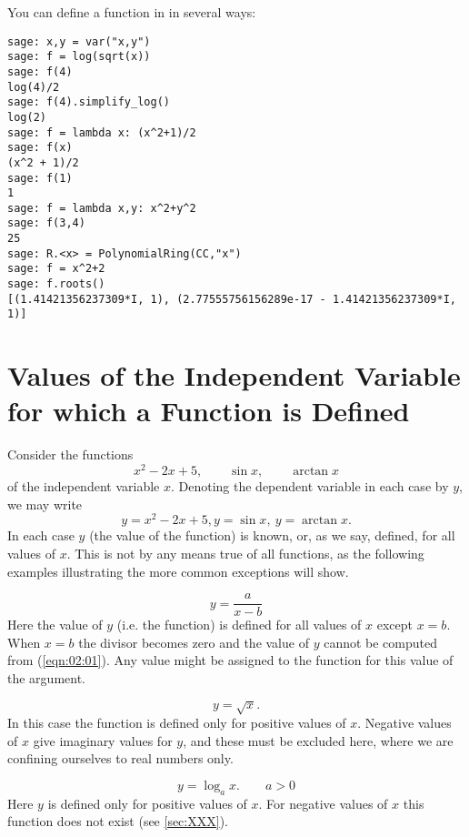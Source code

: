 You can define a function in \SAGE in several ways:

\begin{Verbatim}[fontsize=\scriptsize,fontfamily=courier,fontshape=tt,frame=single,label=\SAGE]
sage: x,y = var("x,y")
sage: f = log(sqrt(x))
sage: f(4)
log(4)/2
sage: f(4).simplify_log()
log(2)
sage: f = lambda x: (x^2+1)/2
sage: f(x)
(x^2 + 1)/2
sage: f(1)
1
sage: f = lambda x,y: x^2+y^2
sage: f(3,4)
25
sage: R.<x> = PolynomialRing(CC,"x")
sage: f = x^2+2
sage: f.roots()
[(1.41421356237309*I, 1), (2.77555756156289e-17 - 1.41421356237309*I, 1)]
\end{Verbatim}

\section[Values for which a Function is Defined]{Values of the Independent
Variable for which a Function is Defined}
\label{sec:02:07}

Consider the functions
\[
  x^2 - 2x + 5,\qquad \sin x,\qquad \arctan x
\]
of the independent variable $x$. Denoting the dependent variable in each case
by $y$, we may write
\[
  y = x^2 - 2 x + 5, y = \sin x,\ y = \arctan x.
\]
In each case $y$ (the value of the function) is known, or, as we say, defined,
for all values of $x$. This is not by any means true of all functions, as the
following examples illustrating the more common exceptions will show.

\begin{equation}
  y = \frac{a}{x - b}
  \label{eqn:02:01}
\end{equation}
Here the value of $y$ (i.e. the function) is defined for all values of $x$
except $x = b$. When $x = b$ the divisor becomes zero and the value of $y$
cannot be computed from (\ref{eqn:02:01}).  Any value might be assigned to
the function for this value of the argument.

\begin{equation}
  y = \sqrt{x}.
  \label{eqn:02:02}
\end{equation}
In this case the function is defined only for positive values of $x$.
Negative values of $x$ give imaginary values for $y$, and these must be
excluded here, where we are confining ourselves to real numbers only.

\begin{equation}
  y = \log_a{x}. \qquad a > 0
  \label{eqn:02:03}
\end{equation}
Here $y$ is defined only for positive values of $x$. For negative values of $x$
this function does not exist (see \ref{sec:XXX}).

